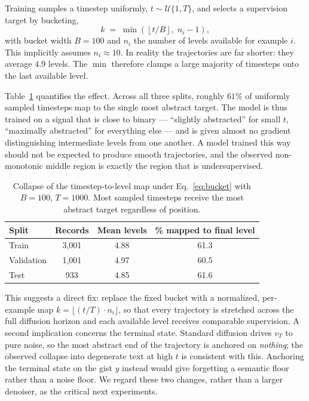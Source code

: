 \documentclass{article}
\begin{document}
Training samples a timestep uniformly, $t \sim \mathcal{U}\{1, T\}$, and selects a supervision target by bucketing,
\begin{equation}
k \;=\; \min\!\left(\left\lfloor t / B \right\rfloor,\; n_i - 1\right),
\label{eq:bucket}
\end{equation}
with bucket width $B{=}100$ and $n_i$ the number of levels available for example $i$. This implicitly assumes $n_i \approx 10$. In reality the trajectories are far shorter: they average $4.9$ levels. The $\min$ therefore clamps a large majority of timesteps onto the last available level.

Table~\ref{tab:collapse} quantifies the effect. Across all three splits, roughly $61\%$ of uniformly sampled timesteps map to the single most abstract target. The model is thus trained on a signal that is close to binary --- ``slightly abstracted'' for small $t$, ``maximally abstracted'' for everything else --- and is given almost no gradient distinguishing intermediate levels from one another. A model trained this way should not be expected to produce smooth trajectories, and the observed non-monotonic middle region is exactly the region that is undersupervised.

\begin{table}[h]
  \centering
  \small
  \caption{Collapse of the timestep-to-level map under Eq.~\ref{eq:bucket} with $B{=}100$, $T{=}1000$. Most sampled timesteps receive the most abstract target regardless of position.}
  \label{tab:collapse}
  \begin{tabular}{lccc}
    \toprule
    Split & Records & Mean levels & \% mapped to final level \\
    \midrule
    Train      & 3{,}001 & 4.88 & 61.3 \\
    Validation & 1{,}001 & 4.97 & 60.5 \\
    Test       & 933     & 4.85 & 61.6 \\
    \bottomrule
  \end{tabular}
\end{table}

This suggests a direct fix: replace the fixed bucket with a normalized, per-example map $k = \lfloor (t/T) \cdot n_i \rfloor$, so that every trajectory is stretched across the full diffusion horizon and each available level receives comparable supervision. A second implication concerns the terminal state. Standard diffusion drives $v_T$ to pure noise, so the most abstract end of the trajectory is anchored on \emph{nothing}; the observed collapse into degenerate text at high $t$ is consistent with this. Anchoring the terminal state on the gist $y$ instead would give forgetting a semantic floor rather than a noise floor. We regard these two changes, rather than a larger denoiser, as the critical next experiments.
\end{document}
